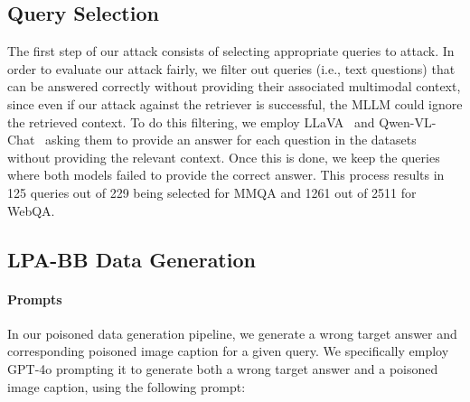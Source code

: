 \subsection{Query Selection}
\label{appendix:query_selection}
The first step of our attack consists of selecting appropriate queries to attack. 
In order to evaluate our attack fairly, we filter out queries (i.e., text questions) that can be answered correctly without providing their associated multimodal context, since even if our attack against the retriever is successful, the MLLM could ignore the retrieved context.
To do this filtering, we employ LLaVA~\citep{liu2024llavanext} and Qwen-VL-Chat~\citep{bai2023qwen} asking them to provide an answer for each question in the datasets without providing the relevant context. Once this is done, we keep the queries where both models failed to provide the correct answer. This process results in 125 queries out of 229 being selected for MMQA and 1261 out of 2511 for WebQA.

\subsection{LPA-BB Data Generation}
\paragraph{Prompts}
\label{appendix:prompt}
In our poisoned data generation pipeline, we generate a wrong target answer and corresponding poisoned image caption for a given query. We specifically employ GPT-4o prompting it to generate both a wrong target answer and a poisoned image caption, using the following prompt:


